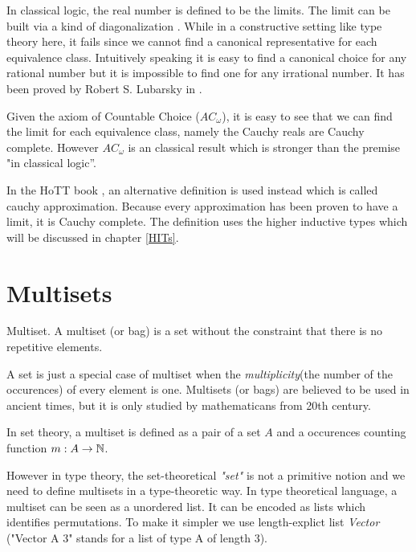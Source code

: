 In classical logic, the real number is defined to be the limits. The
limit can be built via a kind of diagonalization
\cite{DBLP:journals/entcs/Lubarsky07}.
While in a constructive setting like type theory here, it fails since
we cannot find a canonical representative for each equivalence
class. Intuitively speaking it is easy to find a canonical choice for
any rational number but it is impossible to find one for any
irrational number. It has been proved by Robert S. Lubarsky in
\cite{DBLP:journals/entcs/Lubarsky07}.

Given the axiom of Countable Choice ($AC_{\omega}$), it is easy to see that we can
find the limit for each equivalence class, namely the Cauchy reals 
are Cauchy complete. However $AC_{\omega}$ is an classical result
which is stronger than the premise "in classical logic''.

In the HoTT book \cite{hott}, an alternative definition is used
instead which is called cauchy approximation. Because every
approximation has been proven to have a limit, it is Cauchy complete.
The definition uses the higher inductive types which will be discussed
in chapter \ref{HITs}.

\section{Multisets}

\begin{definition}

Multiset. A multiset (or bag) is a set without the constraint that there is no repetitive elements.

\end{definition}

A set is just a special case of multiset when the
\emph{multiplicity}(the number of the occurences) of every element is one.
Multisets (or bags) are believed to be used in ancient times, but it
is only 
studied by mathematicans from 20th century.

In set theory, a multiset is defined as a pair of a set $A$ and a
occurences counting function $m : A \rightarrow \mathbb{N}$.

However in type theory, the set-theoretical \emph{"set"} is not a
primitive notion and we need to define multisets in a type-theoretic
way. 
In type theoretical language, a multiset can be seen as a unordered
list. It can be encoded as lists which identifies
permutations. To make it simpler we use length-explict list
\emph{Vector} ("Vector A 3" stands for a list of type A of length 3).


